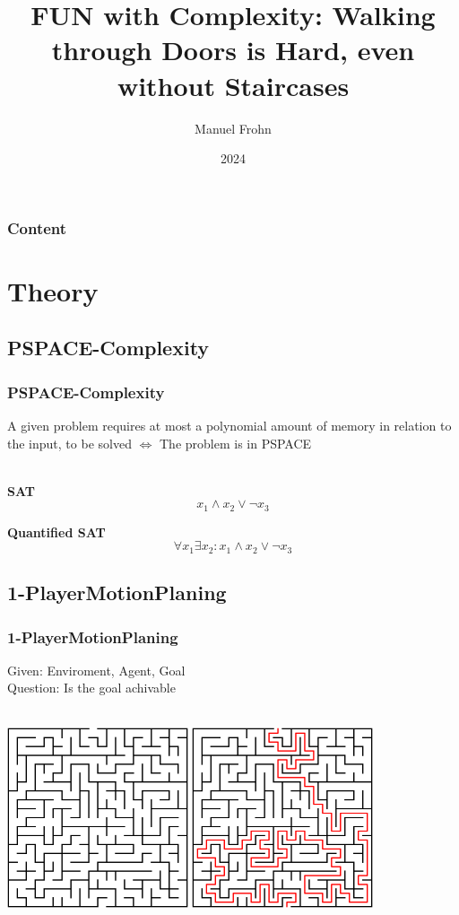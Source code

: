 \documentclass{beamer}
\title{FUN with Complexity: Walking through Doors is Hard, even without Staircases}
\author{Manuel Frohn}
\institute{RWTH Aachen}
\date{2024}
\begin{document}
\frame{\titlepage}
\begin{frame}
  \frametitle{Content}
  \tableofcontents
\end{frame}
\section{Theory}
\subsection{PSPACE-Complexity}
\begin{frame}
  \frametitle{PSPACE-Complexity}
  A given problem requires at most a polynomial amount of memory in relation to the
  input, to be solved $\Leftrightarrow$ The problem is in PSPACE
  \\~\\
  \begin{minipage}[t]{0.48\textwidth}
    \textbf{SAT}
    \[ x_1 \land x_2 \lor \lnot x_3 \]
  \end{minipage}
  \begin{minipage}[t]{0.48\textwidth}
    \textbf{Quantified SAT}
    \[ \forall x_1 \exists x_2 : x_1 \land x_2 \lor \lnot x_3 \]
  \end{minipage}
\end{frame}
\subsection{1-PlayerMotionPlaning}
\begin{frame}
  \frametitle{1-PlayerMotionPlaning}
  Given: Enviroment, Agent, Goal \\
  Question: Is the goal achivable
  \\~\\
  \centerline{
    \includegraphics[width=0.40\textwidth]{res/Maze.png}
    \hspace{2.5cm}
    \includegraphics[width=0.40\textwidth]{res/MazeSolved.png}
  }
\end{frame}
\end{document}
